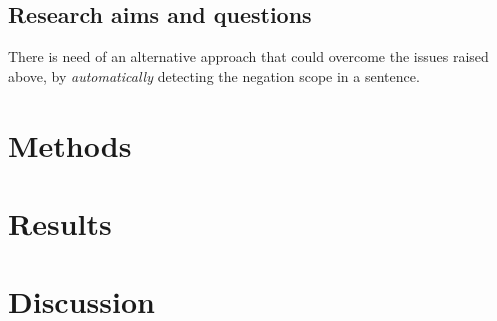 \documentclass{article}
\begin{document}
\subsection{Research aims and questions}
There is need of an alternative approach that could overcome the issues raised above, by \textit{automatically} detecting the negation scope in a sentence. 

\section{Methods}




\section{Results}




\section{Discussion}
\end{document}

